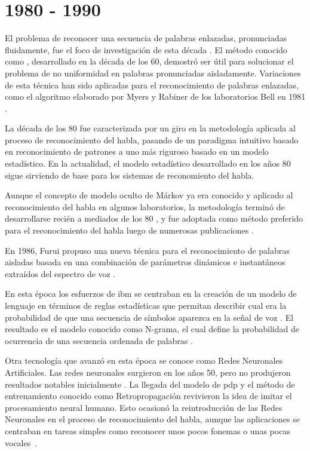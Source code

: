 \section{1980 - 1990}
\label{sec:80s}

El problema de reconocer una secuencia de palabras enlazadas, pronunciadas fluidamente, fue el foco
de investigaci\'{o}n de esta d\'{e}cada \cite{Furui50Years2004}. El m\'{e}todo conocido como 
, desarrollado en la d\'{e}cada de los 60, demostr\'{o} ser \'{u}til 
para solucionar el problema de no uniformidad en palabras pronunciadas aisladamente. Variaciones de esta 
t\'{e}cnica han sido aplicadas para el reconocimiento de palabras enlazadas, como el algoritmo elaborado
por Myers y Rabiner de los laboratorios Bell en 1981 \cite{MyersALevel1981}.

La d\'{e}cada de los 80 fue caracterizada por un giro en la metodolog\'{i}a aplicada al proceso de
reconocimiento del habla, pasando de un paradigma intuitivo basado en reconocimiento de patrones 
a uno m\'{a}s riguroso basado en un modelo estad\'{i}stico. En la actualidad, el modelo estad\'{i}stico
desarrollado en los a\~{n}os 80 sigue sirviendo de base para los sistemas de reconomiento del habla.

Aunque el concepto de modelo oculto de M\'{a}rkov ya era conocido y aplicado al reconocimiento del habla 
en algunos laboratorios, la metodolog\'{i}a termin\'{o} de desarrollarse reci\'{e}n a mediados 
de los 80 \cite{JuangAutomaticSpeech}, y fue adoptada como m\'{e}todo preferido para el reconocimiento 
del habla luego de numerosas publicaciones \cite{LevinsonAnIntroduction1983, FergusonHidden1980}.

En 1986, Furui propuso una nueva t\'{e}cnica para el reconocimiento de palabras aisladas basada en
una combinaci\'{o}n de par\'{a}metros din\'{a}micos e instant\'{a}neos extra\'{i}dos del espectro de
voz \cite{FuruiSpeaker1986}.

En esta \'{e}poca los esfuerzos de \gls{ibm} se centraban en la creaci\'{o}n de un modelo de lenguaje 
en t\'{e}rminos de reglas estad\'{i}sticas que permitan describir cual era la probabilidad de que una 
secuencia de s\'{i}mbolos aparezca en la se\~{n}al de voz \cite{Furui50Years2004}. El resultado es el
modelo conocido como N-grama, el cual define la probabilidad de ocurrencia de una secuencia ordenada
de palabras \cite{JelinekTheDevelopment1986}.

Otra tecnolog\'{i}a que avanz\'{o} en esta \'{e}poca se conoce como Redes Neuronales Artificiales. 
Las redes neuronales surgieron en los a\~{n}os 50, pero no produjeron resultados notables 
inicialmente \cite{JuangAutomaticSpeech}. La llegada del modelo de \gls{pdp} y el m\'{e}todo 
de entrenamiento conocido como Retropropagaci\'{o}n revivieron la idea de imitar el procesamiento 
neural humano. Esto ocasion\'{o} la reintroducci\'{o}n de las Redes Neuronales en el proceso de reconocimiento del habla, aunque las aplicaciones se centraban en tareas simples
como reconocer unos pocos fonemas o unas pocas \mbox{vocales \cite{JuangAutomaticSpeech}}.

